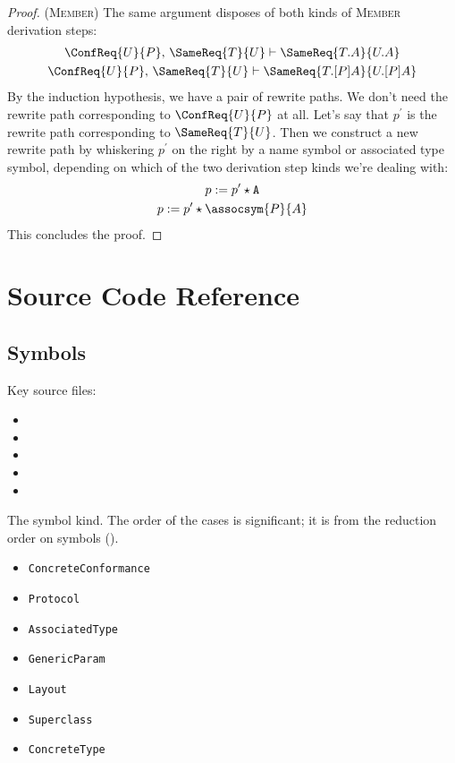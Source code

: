 \documentclass[../generics]{subfiles}
\begin{document}
\begin{proof}
(\textsc{Member}) The same argument disposes of both kinds of \textsc{Member} derivation steps:
\begin{gather*}
\ConfReq{U}{P},\,\SameReq{T}{U}\vdash\SameReq{T.A}{U.A}\\
\ConfReq{U}{P},\,\SameReq{T}{U}\vdash\SameReq{T.[P]A}{U.[P]A}
\end{gather*}
By the induction hypothesis, we have a pair of rewrite paths. We don't need the rewrite path corresponding to $\ConfReq{U}{P}$ at all. Let's say that $p^\prime$ is the rewrite path corresponding to $\SameReq{T}{U}$. Then we construct a new rewrite path by whiskering $p^\prime$ on the right by a name symbol or associated type symbol, depending on which of the two derivation step kinds we're dealing with:
\begin{gather*}
p := p^\prime \star \texttt{A}\\
p := p^\prime \star \assocsym{P}{A}
\end{gather*}
This concludes the proof.
\end{proof}

\section{Source Code Reference}\label{symbols terms rules sourceref}

\subsection*{Symbols}

Key source files:
\begin{itemize}
\item {}
\item {}
\item {}
\item {}
\item {}
\end{itemize}


The symbol kind. The order of the cases is significant; it is from the reduction order on symbols ().
\begin{itemize}
\item \texttt{ConcreteConformance}
\item \texttt{Protocol}
\item \texttt{AssociatedType}
\item \texttt{GenericParam}
\item \texttt{Layout}
\item \texttt{Superclass}
\item \texttt{ConcreteType}
\end{itemize}
\end{document}
